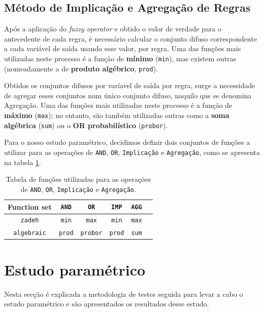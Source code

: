\documentclass{article}
\begin{document}
\clearpage

\subsection{Método de Implicação e Agregação de Regras}
Após a aplicação do \textit{fuzzy operator} e obtido o valor de verdade para o antecedente de cada regra, é necessário calcular o conjunto difuso correspondente a cada variável de saída usando esse valor, por regra. Uma das funções mais utilizadas neste processo é a função de \textbf{mínimo} (\texttt{min}), mas existem outras (nomeadamente a de \textbf{produto algébrico}, \texttt{prod}).

Obtidos os conjuntos difusos por varíavel de saída por regra, surge a necessidade de agregar esses conjuntos num único conjunto difuso, naquilo que se denomina Agregação. Uma das funções mais utilizadas neste processo é a função de \textbf{máximo} (\texttt{max}); no entanto, são também utilizadas outras como a \textbf{soma algébrica} (\texttt{sum}) ou o \textbf{OR probabilístico} (\texttt{probor}).

Para o nosso estudo paramétrico, decidimos definir dois conjuntos de funções a utilizar para as operações de \texttt{AND}, \texttt{OR}, \texttt{Implicação} e \texttt{Agregação}, como se apresenta na tabela \ref{and_or_imp_agg_table}.

\begin{table}[!h]
\centering
	\caption{Tabela de funções utilizadas para as operações de \texttt{AND}, \texttt{OR}, \texttt{Implicação} e \texttt{Agregação}.}
	\label{and_or_imp_agg_table}
	\begin{tabular}{|c|c|c|c|c|c|}
	\hline
	Function set & \texttt{AND} & \texttt{OR} & \texttt{IMP} & \texttt{AGG} \\
	\hline 
	\texttt{zadeh} & \texttt{min} & \texttt{max} & \texttt{min} & \texttt{max} \\ 
	\hline 
	\texttt{algebraic} & \texttt{prod} & \texttt{probor} & \texttt{prod} & \texttt{sum} \\ 
	\hline 
	\end{tabular} 
\end{table}

\section{Estudo paramétrico}
\indent \indent Nesta secção é explicada a metodologia de testes seguida para levar a cabo o estudo paramétrico e são apresentados os resultados desse estudo.
\end{document}
